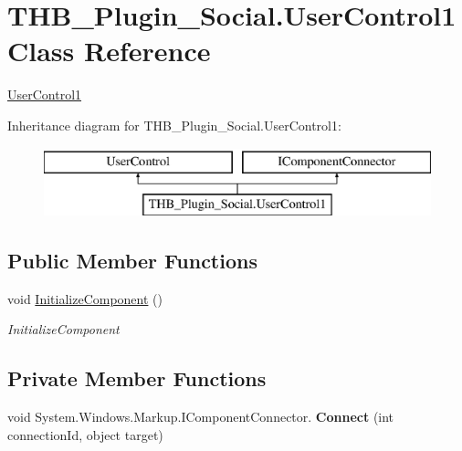 \hypertarget{class_t_h_b___plugin___social_1_1_user_control1}{}\section{T\+H\+B\+\_\+\+Plugin\+\_\+\+Social.\+User\+Control1 Class Reference}
\label{class_t_h_b___plugin___social_1_1_user_control1}


\mbox{\hyperlink{class_t_h_b___plugin___social_1_1_user_control1}{User\+Control1}}  


Inheritance diagram for T\+H\+B\+\_\+\+Plugin\+\_\+\+Social.\+User\+Control1\+:\begin{figure}[H]
\begin{center}
\leavevmode
\includegraphics[height=2.000000cm]{d1/d79/class_t_h_b___plugin___social_1_1_user_control1}
\end{center}
\end{figure}
\subsection*{Public Member Functions}
\begin{DoxyCompactItemize}
\item 
void \mbox{\hyperlink{class_t_h_b___plugin___social_1_1_user_control1_a25fbdc8418a5a7c4054d91d6aeb14fcf}{Initialize\+Component}} ()
\begin{DoxyCompactList}\small\item\em Initialize\+Component \end{DoxyCompactList}\end{DoxyCompactItemize}
\subsection*{Private Member Functions}
\begin{DoxyCompactItemize}
\item 
\mbox{\label{class_t_h_b___plugin___social_1_1_user_control1_ae3f433a2f257e1f3ebec48d3b1d5365f}} 
void System.\+Windows.\+Markup.\+I\+Component\+Connector. {\bfseries Connect} (int connection\+Id, object target)
\end{DoxyCompactItemize}
